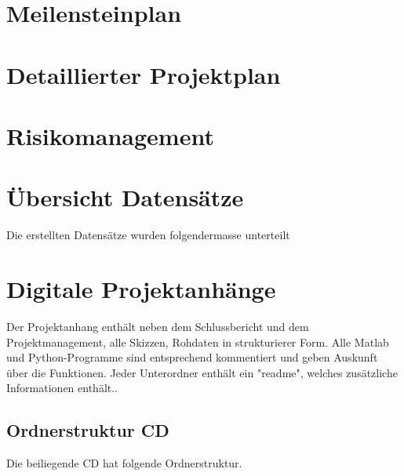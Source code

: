 \appendix

\chapter{Meilensteinplan}
\label{AnhangA}

\chapter{Detaillierter Projektplan}
\label{AnhangB}

\chapter{Risikomanagement}
\label{AnhangC}

\chapter{Übersicht Datensätze }
\label{AnhangD}

Die erstellten Datensätze wurden folgendermasse unterteilt




\chapter{Digitale Projektanhänge}
\label{AnhangE}

Der Projektanhang enthält neben dem Schlussbericht und dem Projektmanagement, alle Skizzen, Rohdaten in strukturierer Form. Alle Matlab und Python-Programme sind entsprechend kommentiert und geben Auskunft über die Funktionen. Jeder Unterordner enthält ein "readme", welches zusätzliche Informationen enthält..
\section{Ordnerstruktur CD}


Die beiliegende CD hat folgende Ordnerstruktur.

